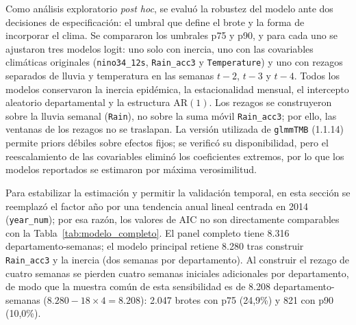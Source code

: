 \documentclass[11pt,a4paper]{article}
\begin{document}
Como análisis exploratorio \textit{post hoc}, se evaluó la robustez del modelo ante dos decisiones de especificación: el umbral que define el brote y la forma de incorporar el clima. Se compararon los umbrales p75 y p90, y para cada uno se ajustaron tres modelos logit: uno solo con inercia, uno con las covariables climáticas originales (\texttt{nino34\_12s}, \texttt{Rain\_acc3} y \texttt{Temperature}) y uno con rezagos separados de lluvia y temperatura en las semanas $t-2$, $t-3$ y $t-4$. Todos los modelos conservaron la inercia epidémica, la estacionalidad mensual, el intercepto aleatorio departamental y la estructura $\text{AR}(1)$. Los rezagos se construyeron sobre la lluvia semanal (\texttt{Rain}), no sobre la suma móvil \texttt{Rain\_acc3}; por ello, las ventanas de los rezagos no se traslapan. La versión utilizada de \texttt{glmmTMB} (1.1.14) permite priors débiles sobre efectos fijos; se verificó su disponibilidad, pero el reescalamiento de las covariables eliminó los coeficientes extremos, por lo que los modelos reportados se estimaron por máxima verosimilitud.

\medskip

Para estabilizar la estimación y permitir la validación temporal, en esta sección se reemplazó el factor año por una tendencia anual lineal centrada en 2014 (\texttt{year\_num}); por esa razón, los valores de AIC no son directamente comparables con la Tabla~\ref{tab:modelo_completo}. El panel completo tiene 8.316 departamento-semanas; el modelo principal retiene 8.280 tras construir \texttt{Rain\_acc3} y la inercia (dos semanas por departamento). Al construir el rezago de cuatro semanas se pierden cuatro semanas iniciales adicionales por departamento, de modo que la muestra común de esta sensibilidad es de 8.208 departamento-semanas ($8.280 - 18 \times 4 = 8.208$): 2.047 brotes con p75 (24,9\%) y 821 con p90 (10,0\%).
\end{document}
